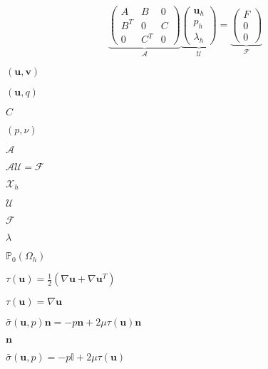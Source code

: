\documentclass{article}
\begin{document}
\[ \label{eq:28} \underbrace{\begin{pmatrix} A & B & 0\\ B^T & 0 & C\\ 0 & C^T & 0 \end{pmatrix}}_{\mathcal{A}} \underbrace{ \begin{pmatrix} \mathbf{u}_h\\ p_h\\ \lambda_h \end{pmatrix}}_{\mathcal{U}} = \underbrace{\begin{pmatrix} F\\ 0\\ 0 \end{pmatrix}}_{\mathcal{F}} \]
\pagebreak

$(\mathbf{u},\mathbf{v})$
\pagebreak

$(\mathbf{u},q)$
\pagebreak

$C$
\pagebreak

$(p,\nu)$
\pagebreak

$\mathcal{A}$
\pagebreak

$\mathcal{A} \mathcal{U} = \mathcal{F}$
\pagebreak

$\mathcal{X}_h$
\pagebreak

$\mathcal{U}$
\pagebreak

$\mathcal{F}$
\pagebreak

$\lambda$
\pagebreak

$\mathbb{P}_0(\Omega_h)$
\pagebreak

$\tau(\mathbf{u}) = \frac{1}{2}(\nabla \mathbf{u} + \nabla \mathbf{u}^T)$
\pagebreak

$\tau(\mathbf{u}) = \nabla \mathbf{u}$
\pagebreak

$\bar{\sigma}(\mathbf{u},p) \mathbf{n} = -p \mathbf{n} + 2 \mu \tau(\mathbf{u}) \mathbf{n}$
\pagebreak

$\mathbf{n}$
\pagebreak

$\bar{\sigma}(\mathbf{u},p) = -p \mathbb{I} + 2 \mu \tau(\mathbf{u})$
\pagebreak
\end{document}
